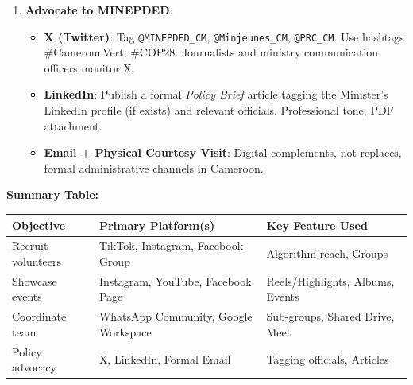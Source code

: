 \documentclass[11pt]{article}
\begin{document}
\begin{exoresolu}
\begin{enumerate}
\begin{itemize}
                  \item \textbf{WhatsApp Group (with Communities)}: Universal in Cameroon; low data usage; voice notes for quick updates; file sharing (PDF budgets, GPS locations). Use \textit{Communities} to separate \textit{Logistics}, \textit{Finance}, \textit{Communications} sub-groups under one umbrella.
                  \item \textbf{Google Workspace (free for non-profits)}: Shared Drive for documents (proposals, reports), Google Meet for monthly virtual meetings, Calendar for scheduling. Apply for \textit{Google for Nonprofits} (requires registration with MINAS/Ministry of Youth).
              \end{itemize}
        \item \textbf{Advocate to MINEPDED}:
              \begin{itemize}
                  \item \textbf{X (Twitter)}: Tag \texttt{@MINEPDED\_CM}, \texttt{@Minjeunes\_CM}, \texttt{@PRC\_CM}. Use hashtags \#CamerounVert, \#COP28. Journalists and ministry communication officers monitor X.
                  \item \textbf{LinkedIn}: Publish a formal \textit{Policy Brief} article tagging the Minister's LinkedIn profile (if exists) and relevant officials. Professional tone, PDF attachment.
                  \item \textbf{Email + Physical Courtesy Visit}: Digital complements, not replaces, formal administrative channels in Cameroon.
              \end{itemize}
    \end{enumerate}
    \textbf{Summary Table:}
    \begin{center}
    \begin{tabularx}{\linewidth}{|l|X|X|}\hline
    \rowcolor{popblueL} \textbf{Objective} & \textbf{Primary Platform(s)} & \textbf{Key Feature Used} \\ \hline
    Recruit volunteers & TikTok, Instagram, Facebook Group & Algorithm reach, Groups \\ \hline
    Showcase events & Instagram, YouTube, Facebook Page & Reels/Highlights, Albums, Events \\ \hline
    Coordinate team & WhatsApp Community, Google Workspace & Sub-groups, Shared Drive, Meet \\ \hline
    Policy advocacy & X, LinkedIn, Formal Email & Tagging officials, Articles \\ \hline
    \end{tabularx}
    \end{center}
\end{exoresolu}
\end{document}
